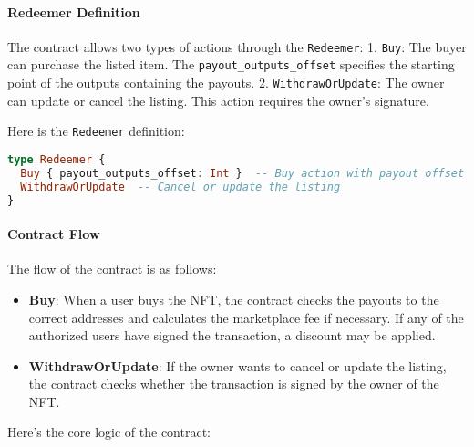 \paragraph{Redeemer Definition}
The contract allows two types of actions through the \texttt{Redeemer}:
1. \texttt{Buy}: The buyer can purchase the listed item. The \texttt{payout\_outputs\_offset} specifies the starting point of the outputs containing the payouts.
2. \texttt{WithdrawOrUpdate}: The owner can update or cancel the listing. This action requires the owner’s signature.

Here is the \texttt{Redeemer} definition:

\begin{lstlisting}[language=haskell, caption=Redeemer Definition in Aiken]
type Redeemer {
  Buy { payout_outputs_offset: Int }  -- Buy action with payout offset
  WithdrawOrUpdate  -- Cancel or update the listing
}
\end{lstlisting}

\paragraph{Contract Flow}
The flow of the contract is as follows:

\begin{itemize}
    \item \textbf{Buy}: When a user buys the NFT, the contract checks the payouts to the correct addresses and calculates the marketplace fee if necessary. If any of the authorized users have signed the transaction, a discount may be applied.
    \item \textbf{WithdrawOrUpdate}: If the owner wants to cancel or update the listing, the contract checks whether the transaction is signed by the owner of the NFT.
\end{itemize}

Here’s the core logic of the contract:

